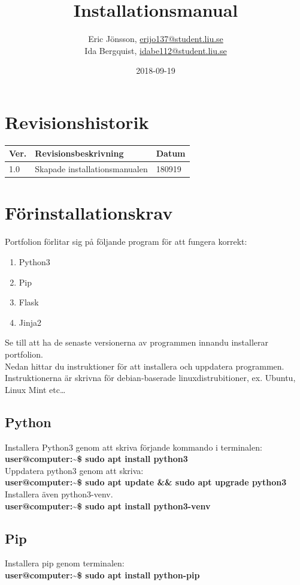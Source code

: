 \documentclass{TDP003mall}
\author{Eric Jönsson, \url{erijo137@student.liu.se}\\
  Ida Bergquist, \url{idabe112@student.liu.se}}
\title{Installationsmanual}
\date{2018-09-19}
\begin{document}
\projectpage
\section{Revisionshistorik}
\begin{table}[!h]
\begin{tabularx}{\linewidth}{|l|X|l|}
\hline
Ver. & Revisionsbeskrivning & Datum \\\hline
1.0 & Skapade installationsmanualen & 180919 \\\hline
\end{tabularx}
\end{table}

\section{Förinstallationskrav}
Portfolion förlitar sig på följande program för att fungera korrekt:\\
\begin{enumerate}
\item Python3
\item Pip
\item Flask
\item Jinja2
\end{enumerate}
Se till att ha de senaste versionerna av programmen innandu installerar portfolion.\\
Nedan hittar du instruktioner för att installera och uppdatera programmen. Instruktionerna är skrivna för debian-baserade linuxdistrubitioner, ex. Ubuntu, Linux Mint etc\ldots
\subsection{Python}
Installera Python3 genom att skriva förjande kommando i terminalen:\\
\textbf{\textcolor{terminalgreen}{user@computer}:\~{}\$ sudo apt install python3} \\
Uppdatera python3 genom att skriva:\\
\textbf{\textcolor{terminalgreen}{user@computer}:\~{}\$ sudo apt update \&\& sudo apt upgrade python3}\\
Installera även python3-venv.\\
\textbf{\textcolor{terminalgreen}{user@computer}:\~{}\$ sudo apt install python3-venv}\\

\subsection{Pip}
Installera pip genom terminalen:\\
\textbf{\textcolor{terminalgreen}{user@computer}:\~{}\$ sudo apt install python-pip}\\
\end{document}

